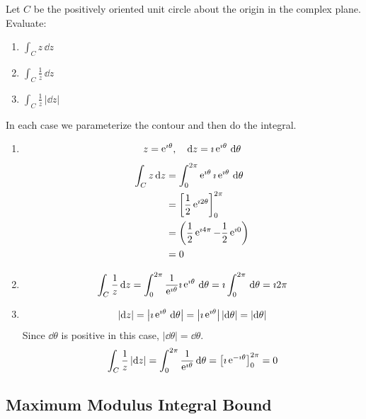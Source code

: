 \begin{Example}
  \label{three_comp_line_int}
  Let $C$ be the positively oriented unit circle about the origin in the 
  complex plane.  Evaluate:
  \begin{enumerate}
  \item
    $\int_C z\,\dd z$
  \item
    $\int_C \frac{1}{z}\,\dd z$
  \item
    $\int_C \frac{1}{z}\,|\dd z|$
  \end{enumerate}

  In each case we parameterize the contour and then do the integral.
  \begin{enumerate}
  \item
    \[
    z = \mathop{\mathrm{e}}\nolimits^{\imath \theta}, \quad \mathrm{d} z = \imath \mathop{\mathrm{e}}\nolimits^{\imath \theta} \,\mathrm{d} \theta 
    \]
    \begin{align*}
      \int_C z\,\mathrm{d} z 
      &= \int_0^{2\pi} \mathop{\mathrm{e}}\nolimits^{\imath \theta} \imath \mathop{\mathrm{e}}\nolimits^{\imath \theta}\,\mathrm{d} \theta 
      \\
      &= \left[ \frac{1}{2} \mathop{\mathrm{e}}\nolimits^{\imath 2 \theta} \right]_0^{2 \pi} 
      \\
      &= \left( \frac{1}{2} \mathop{\mathrm{e}}\nolimits^{\imath 4 \pi} - \frac{1}{2} \mathop{\mathrm{e}}\nolimits^{\imath 0} \right) 
      \\
      &= 0
    \end{align*}
  \item
    \[
    \int_C \frac{1}{z}\,\mathrm{d} z 
    = \int_0^{2 \pi} \frac{1}{\mathop{\mathrm{e}}\nolimits^{\imath \theta}} \imath \mathop{\mathrm{e}}\nolimits^{\imath \theta}\,\mathrm{d} \theta
    = \imath \int_0^{2 \pi} \,\mathrm{d} \theta = \imath 2 \pi
    \]
  \item
    \[
    |\mathrm{d} z|  = \left| \imath \mathop{\mathrm{e}}\nolimits^{\imath \theta} \,\mathrm{d} \theta \right| 
    = \left| \imath \mathop{\mathrm{e}}\nolimits^{\imath \theta} \right|  | \mathrm{d} \theta |
    = |\mathrm{d} \theta|
    \]
    Since $\dd \theta$ is positive in this case, $|\dd \theta| = \dd \theta$.
    \[
    \int_C \frac{1}{z}\,|\mathrm{d} z|
    = \int_0^{2 \pi} \frac{ 1 }{ \mathop{\mathrm{e}}\nolimits^{\imath \theta} }\,\mathrm{d} \theta
    = \left[ \imath \mathop{\mathrm{e}}\nolimits^{-\imath \theta} \right]_0^{2 \pi}
    = 0
    \]
  \end{enumerate}
\end{Example}




\subsection{Maximum Modulus Integral Bound}


